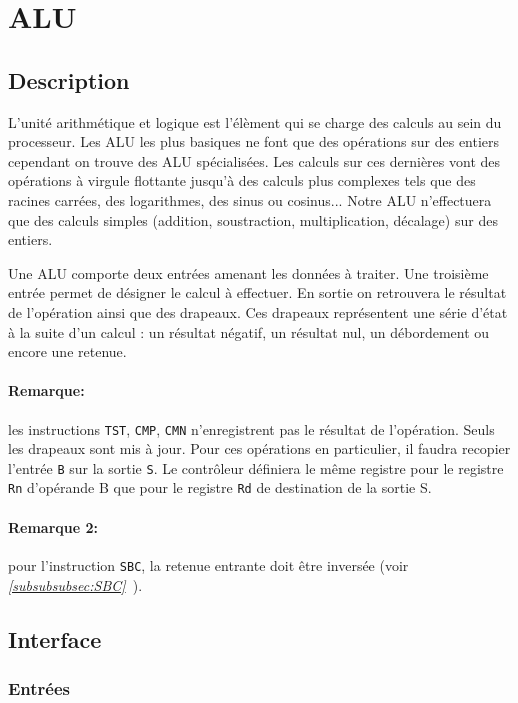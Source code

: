 \section{ALU}

\subsection{Description}

	L'unité arithmétique et logique est l'élèment qui se charge des calculs au sein du processeur. Les ALU les plus basiques ne font que des opérations sur des entiers cependant on trouve des ALU spécialisées. Les calculs sur ces dernières vont des opérations à virgule flottante jusqu'à des calculs plus complexes tels que des racines carrées, des logarithmes, des sinus ou cosinus... Notre ALU n'effectuera que des calculs simples (addition, soustraction, multiplication, décalage) sur des entiers.

	Une ALU comporte deux entrées amenant les données à traiter. Une troisième entrée permet de désigner le calcul à effectuer. En sortie on retrouvera le résultat de l'opération ainsi que des drapeaux. Ces drapeaux représentent une série d'état à la suite d'un calcul : un résultat négatif, un résultat nul, un débordement ou encore une retenue. 


\paragraph{Remarque:} les instructions \texttt{TST}, \texttt{CMP}, \texttt{CMN} n'enregistrent pas le résultat de l'opération. Seuls les drapeaux sont mis à jour.
Pour ces opérations en particulier, il faudra recopier l'entrée \texttt{B} sur la sortie \texttt{S}. Le contrôleur définiera le même registre pour le registre \texttt{Rn} d'opérande B que pour le registre \texttt{Rd} de destination de la sortie S.

\paragraph{Remarque 2:} pour l'instruction \texttt{SBC}, la retenue entrante doit être inversée (voir \textit{\ref{subsubsubsec:SBC}~}).

\subsection{Interface}

\subsubsection{Entrées}

